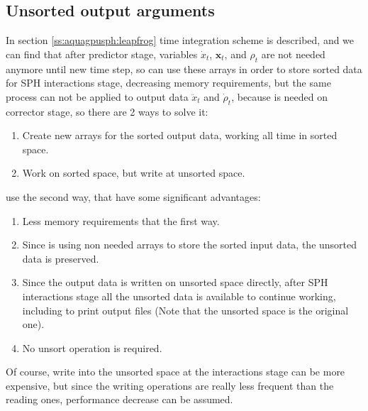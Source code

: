 \subsection{Unsorted output arguments}
%
In section \ref{ss:aquagpusph:leapfrog} time integration scheme is described, and we can find that after predictor
stage, variables $\dot x_{t}$, $\mathbf{x}_{t}$, and $\rho_{t}$ are not needed anymore until new time step,
so \NAME can use these arrays in order to store sorted data for SPH interactions stage, decreasing memory
requirements, but the same process can not be applied to output data $\ddot x_{t}$ and $\dot\rho_{t}$,
because is needed on corrector stage, so there are 2 ways to solve it:
%
\begin{enumerate}
	\item Create new arrays for the sorted output data, working all time in sorted space.
	\item Work on sorted space, but write at unsorted space.
\end{enumerate}
%
\NAME use the second way, that have some significant advantages:
%
\begin{enumerate}
	\item Less memory requirements that the first way.
	\item Since \NAME is using non needed arrays to store the sorted input data, the unsorted data is preserved.
	\item Since the output data is written on unsorted space directly, after SPH interactions stage all the
	unsorted data is available to continue working, including to print output files (Note that the unsorted space
	is the original one).
	\item No unsort operation is required.
\end{enumerate}
%
Of course, write into the unsorted space at the interactions stage can be more expensive, but since the writing
operations are really less frequent than the reading ones, performance decrease can be assumed.
%
